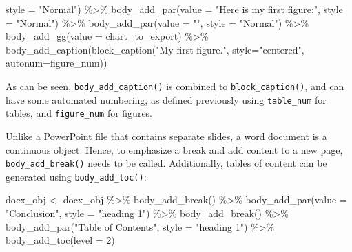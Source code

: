 \documentclass[
]{krantz}
\makeatletter
\newenvironment{Shaded}{\begin{snugshade}}{\end{snugshade}}
\newcommand{\AttributeTok}[1]{\textcolor[rgb]{0.61,0.61,0.61}{#1}}
\newcommand{\DecValTok}[1]{\textcolor[rgb]{0.06,0.06,0.06}{#1}}
\newcommand{\FunctionTok}[1]{\textcolor[rgb]{0,0,0}{#1}}
\newcommand{\NormalTok}[1]{#1}
\newcommand{\OtherTok}[1]{\textcolor[rgb]{0.37,0.37,0.37}{#1}}
\newcommand{\SpecialCharTok}[1]{\textcolor[rgb]{0,0,0}{#1}}
\newcommand{\StringTok}[1]{\textcolor[rgb]{0.5,0.5,0.5}{#1}}
\newenvironment{kframe}{%
\medskip{}
\setlength{\fboxsep}{.8em}
 \def\at@end@of@kframe{}%
 \ifinner\ifhmode%
  \def\at@end@of@kframe{\end{minipage}}%
  \begin{minipage}{\columnwidth}%
 \fi\fi%
 \def\FrameCommand##1{\hskip\@totalleftmargin \hskip-\fboxsep
 \colorbox{shadecolor}{##1}\hskip-\fboxsep
     \hskip-\linewidth \hskip-\@totalleftmargin \hskip\columnwidth}%
 \MakeFramed {\advance\hsize-\width
   \@totalleftmargin\z@ \linewidth\hsize
   \@setminipage}}%
 {\par\unskip\endMakeFramed%
 \at@end@of@kframe}
\renewenvironment{Shaded}{\begin{kframe}}{\end{kframe}}
\makeatother
\begin{document}
\begin{Shaded}
\begin{Highlighting}[]
               \AttributeTok{style =} \StringTok{"Normal"}\NormalTok{) }\SpecialCharTok{\%\textgreater{}\%} 
  \FunctionTok{body\_add\_par}\NormalTok{(}\AttributeTok{value =} \StringTok{"Here is my first figure:"}\NormalTok{, }
               \AttributeTok{style =} \StringTok{"Normal"}\NormalTok{) }\SpecialCharTok{\%\textgreater{}\%} 
  \FunctionTok{body\_add\_par}\NormalTok{(}\AttributeTok{value =} \StringTok{""}\NormalTok{, }
               \AttributeTok{style =} \StringTok{"Normal"}\NormalTok{) }\SpecialCharTok{\%\textgreater{}\%} 
  \FunctionTok{body\_add\_gg}\NormalTok{(}\AttributeTok{value =}\NormalTok{ chart\_to\_export) }\SpecialCharTok{\%\textgreater{}\%} 
  \FunctionTok{body\_add\_caption}\NormalTok{(}\FunctionTok{block\_caption}\NormalTok{(}\StringTok{"My first figure."}\NormalTok{, }
                                 \AttributeTok{style=}\StringTok{"centered"}\NormalTok{, }
                                 \AttributeTok{autonum=}\NormalTok{figure\_num))}
\end{Highlighting}
\end{Shaded}

As can be seen, \texttt{body\_add\_caption()} is combined to \texttt{block\_caption()}, and can have some automated numbering, as defined previously using \texttt{table\_num} for tables, and \texttt{figure\_num} for figures.

Unlike a PowerPoint file that contains separate slides, a word document is a continuous object. Hence, to emphasize a break and add content to a new page, \texttt{body\_add\_break()} needs to be called. Additionally, tables of content can be generated using \texttt{body\_add\_toc()}:

\begin{Shaded}
\begin{Highlighting}[]
\NormalTok{docx\_obj }\OtherTok{\textless{}{-}}\NormalTok{ docx\_obj }\SpecialCharTok{\%\textgreater{}\%} 
  \FunctionTok{body\_add\_break}\NormalTok{() }\SpecialCharTok{\%\textgreater{}\%} 
  \FunctionTok{body\_add\_par}\NormalTok{(}\AttributeTok{value =} \StringTok{"Conclusion"}\NormalTok{, }\AttributeTok{style =} \StringTok{"heading 1"}\NormalTok{) }\SpecialCharTok{\%\textgreater{}\%} 
  \FunctionTok{body\_add\_break}\NormalTok{() }\SpecialCharTok{\%\textgreater{}\%}
  \FunctionTok{body\_add\_par}\NormalTok{(}\StringTok{"Table of Contents"}\NormalTok{, }\AttributeTok{style =} \StringTok{"heading 1"}\NormalTok{) }\SpecialCharTok{\%\textgreater{}\%} 
  \FunctionTok{body\_add\_toc}\NormalTok{(}\AttributeTok{level =} \DecValTok{2}\NormalTok{)}
\end{Highlighting}
\end{Shaded}
\end{document}
